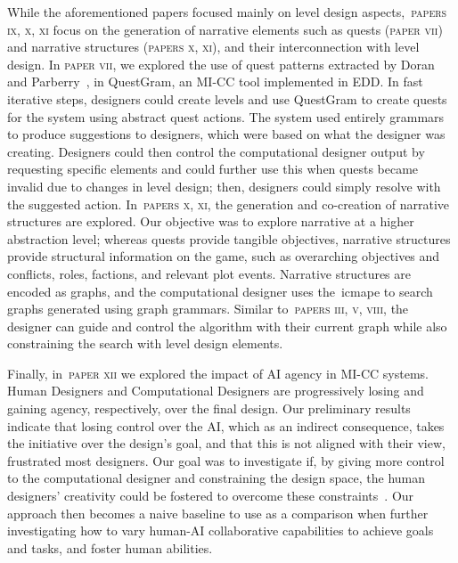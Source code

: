 While the aforementioned papers focused mainly on level design aspects,~\textsc{papers ix, x, xi} focus on the generation of narrative elements such as quests (\textsc{paper vii}) and narrative structures (\textsc{papers x, xi}), and their interconnection with level design. In \textsc{paper vii}, we explored the use of quest patterns extracted by Doran and Parberry~\cite{doran_prototype_2011}, in QuestGram, an MI-CC tool implemented in EDD. In fast iterative steps, designers could create levels and use QuestGram to create quests for the system using abstract quest actions. The system used entirely grammars to produce suggestions to designers, which were based on what the designer was creating. Designers could then control the computational designer output by requesting specific elements and could further use this when quests became invalid due to changes in level design; then, designers could simply resolve with the suggested action. In~\textsc{papers x, xi}, the generation and co-creation of narrative structures are explored. Our objective was to explore narrative at a higher abstraction level; whereas quests provide tangible objectives, narrative structures provide structural information on the game, such as overarching objectives and conflicts, roles, factions, and relevant plot events. Narrative structures are encoded as graphs, and the computational designer uses the~\acrshort{icmape} to search graphs generated using graph grammars. Similar to~\textsc{papers iii, v, viii}, the designer can guide and control the algorithm with their current graph while also constraining the search with level design elements.

Finally, in~\textsc{paper xii} we explored the impact of AI agency in MI-CC systems. Human Designers and Computational Designers are progressively losing and gaining agency, respectively, over the final design. Our preliminary results indicate that losing control over the AI, which as an indirect consequence, takes the initiative over the design's goal, and that this is not aligned with their view, frustrated most designers. Our goal was to investigate if, by giving more control to the computational designer and constraining the design space, the human designers' creativity could be fostered to overcome these constraints~\cite{bhaumik_lode_2021,acar_creativity_2019,boden_creative_2004}. Our approach then becomes a naive baseline to use as a comparison when further investigating how to vary human-AI collaborative capabilities to achieve goals and tasks, and foster human abilities.

